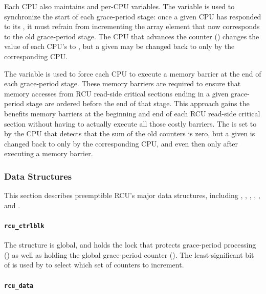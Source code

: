 Each CPU also maintains  and
 per-CPU variables.
The  variable is used to synchronize the
start of each grace-period stage: once a given CPU has responded
to its , it must refrain from incrementing
the  array element that now corresponds to
the old grace-period stage.
The CPU that advances the counter ()
changes the value of each CPU's  to
, but a given 
may be changed back to  only by
the corresponding CPU.

The  variable is used to force each CPU to
execute a memory barrier at the end of each grace-period stage.
These memory barriers are required to ensure that memory accesses from
RCU read-side critical sections ending in a given grace-period stage
are ordered before the end of that stage.
This approach gains the benefits memory barriers at the
beginning and end of each RCU read-side critical section without
having to actually execute all those costly barriers.
The  is set to  by
the CPU that detects that the sum of the old counters is zero,
but a given  is changed back to
 only by the corresponding CPU, and even
then only after executing a memory barrier.

\subsubsection{Data Structures}
\label{app:rcuimpl:Data Structures}

This section describes preemptible RCU's major data structures, including
, , ,
, , and
.

\paragraph{{\tt rcu\_ctrlblk}}
\label{app:rcuimpl:rcu_ctrlblk}

The  structure is global, and holds the lock
that protects grace-period processing () as well
as holding the global grace-period counter ().
The least-significant bit of  is used by
 to select which set of counters to increment.

\paragraph{{\tt rcu\_data}}
\label{app:rcuimpl:rcu_data}

